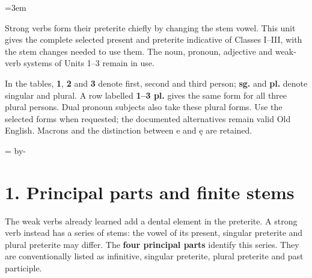 \BookRecto
\begingroup
\renewcommand{\runningtitle}{Unit 4. Strong verbs I–III}
\emergencystretch=3em
\newcommand{\itempara}[2]{\par\addvspace{3pt}\noindent\hangindent=1.8em\hangafter=1\makebox[1.8em][l]{#1.}#2\par}
\newcommand{\reserve}[1]{\par\penalty-100\begingroup\dimen0=\pagegoal\advance\dimen0 by-\pagetotal\ifdim\dimen0<#1\newpage\fi\endgroup}

\raggedright
{}

Strong verbs form their preterite chiefly by changing the stem vowel. This unit gives the complete selected present and preterite indicative of Classes I–III, with the stem changes needed to use them. The noun, pronoun, adjective and weak-verb systems of Units 1–3 remain in use.

In the tables, \textbf{1}, \textbf{2} and \textbf{3} denote first, second and third person; \textbf{sg.} and \textbf{pl.} denote singular and plural. A row labelled \textbf{1–3 pl.} gives the same form for all three plural persons. Dual pronoun subjects also take these plural forms. Use the selected forms when requested; the documented alternatives remain valid Old English. Macrons and the distinction between e and ę are retained.

\reserve{7\baselineskip}
\section*{1. Principal parts and finite stems}

The weak verbs already learned add a dental element in the preterite. A strong verb instead has a series of stems: the vowel of its present, singular preterite and plural preterite may differ. The \textbf{four principal parts} identify this series. They are conventionally listed as infinitive, singular preterite, plural preterite and past participle.

